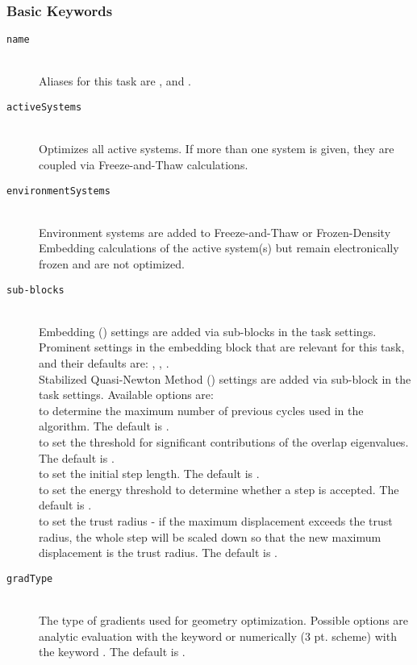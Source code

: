 \subsubsection{Basic Keywords}
\begin{description}
 \item [\texttt{name}]\hfill \\
   Aliases for this task are ,  and .
 \item [\texttt{activeSystems}]\hfill \\
   Optimizes all active systems. If more than one system is given, they are coupled via Freeze-and-Thaw calculations.
 \item [\texttt{environmentSystems}]\hfill \\
   Environment systems are added to Freeze-and-Thaw or Frozen-Density Embedding calculations of the active system(s) but remain electronically frozen and are not optimized.
 \item [\texttt{sub-blocks}]\hfill \\
   Embedding () settings are added via sub-blocks in the task settings.
   Prominent settings in the embedding block that are relevant for this task, and their defaults are:
   , , .
   \\
   Stabilized Quasi-Newton Method () settings are added via sub-block in the task settings.
   Available options are:\\
    to determine the maximum number of previous cycles used in the algorithm. The default is . \\
    to set the threshold for significant contributions of the overlap eigenvalues. The default is . \\
    to set the initial step length. The default is . \\
    to set the energy threshold to determine whether a step is accepted. The default is . \\
    to set the trust radius - if the maximum displacement exceeds the trust radius, the whole step will be scaled down so that the new maximum displacement is the trust radius. The default is . \\
 \item [\texttt{gradType}]\hfill \\
   The type of gradients used for geometry optimization. Possible options are analytic evaluation with the keyword  or numerically (3 pt. scheme) with the keyword . The default is .

\end{description}
